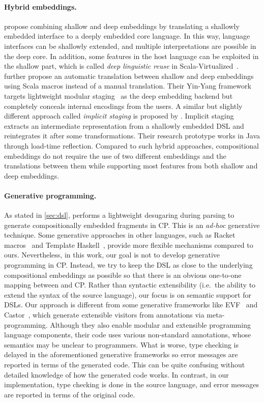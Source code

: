 \paragraph{Hybrid embeddings.}
\citet{svenningsson2015combining} propose combining shallow and deep embeddings
by translating a shallowly embedded interface to a deeply embedded core
language. In this way, language interfaces can be shallowly extended, and
multiple interpretations are possible in the deep core. In addition, some
features in the host language can be exploited in the shallow part, which is
called \emph{deep linguistic reuse} in Scala-Virtualized~\citep{rompf2012scala}.
\citet{jovanovic2014yinyang} further propose an automatic translation between
shallow and deep embeddings using Scala macros instead of a manual translation.
Their Yin-Yang framework targets lightweight modular
staging~\citep{rompf2010lightweight} as the deep embedding backend but
completely conceals internal encodings from the users. A similar but slightly
different approach called \emph{implicit staging} is proposed by
\citet{scherr2014implicit}. Implicit staging extracts an intermediate
representation from a shallowly embedded DSL and reintegrates it after some
transformations. Their research prototype works in Java through load-time
reflection. Compared to such hybrid approaches, compositional embeddings do not
require the use of two different embeddings and the translations between them
while supporting most features from both shallow and deep embeddings.

\paragraph{Generative programming.}
As stated in \autoref{sec:dsl}, \ExT performs a lightweight desugaring during
parsing to generate compositionally embedded fragments in CP. This is an
\emph{ad-hoc} generative technique. Some generative approaches in other
languages, such as Racket macros~\citep{ballantyne2020macros} and Template
Haskell~\citep{sheard2002template}, provide more flexible mechanisms compared to
ours. Nevertheless, in this work, our goal is not to develop generative
programming in CP. Instead, we try to keep the DSL as close to the underlying
compositional embeddings as possible so that there is an obvious one-to-one
mapping between \ExT and CP. Rather than syntactic extensibility (i.e.~the
ability to extend the syntax of the source language), our focus is on semantic
support for DSLs. Our approach is different from some generative frameworks like
EVF~\citep{zhang2017evf} and Castor~\citep{zhang2020castor}, which generate
extensible visitors from annotations via meta-programming. Although they also
enable modular and extensible programming language components, their code uses
various non-standard annotations, whose semantics may be unclear to programmers.
What is worse, type checking is delayed in the aforementioned generative
frameworks so error messages are reported in terms of the generated code. This
can be quite confusing without detailed knowledge of how the generated code
works. In contrast, in our implementation, type checking is done in the source
language, and error messages are reported in terms of the original \ExT code.

